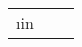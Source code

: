 \documentclass{article}
\begin{document}


\begin{table}
    \begin{tabular}{ccc}
	\for \i in {}
    \end{tabular}
\end{table}
\end{document}
